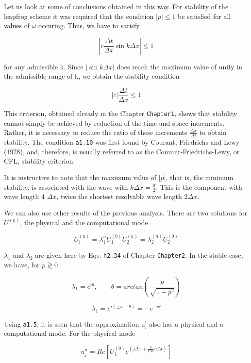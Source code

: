 Let us look at some of conclusions obtained in this way. For stability
of the leapfrog scheme it was required that the condition
\( \left| p \right| \leq 1 \) be satisfied for all values of \(\omega\)
occuring. Thus, we have to satisfy

\[\left| c\frac{\Delta t}{\Delta x}\sin{k\Delta x } \right| \leq 1\]

for any admissible k. Since \(\left| \sin{k\Delta x} \right|\) does
reach the maximum value of unity in the admissible range of k, we obtain
the stability condition

 \[\left| c \right|\frac{\Delta t}{\Delta x} \leq 1\]

This criterion, obtained already in the Chapter \texttt{Chapter1}, shows
that stability cannot simply be achieved by reduction of the time and
space increments. Rather, it is necessary to reduce the ratio of these
increments \(\frac{\Delta x}{\Delta t }\) to obtain stability. The
condition \texttt{a1.10} was first found by Courant, Friedrichs and Lewy
(1928), and, therefore, is usually referred to as the
Courant-Friedrichs-Lewy, or CFL, stability criterion.

It is instructive to note that the maximum value of
\(\left| p \right|\), that is, the minimum stability, is associated with
the wave with \(k\Delta x = \frac{\pi}{2}\). This is the component with
wave length 4 \(\Delta x\), twice the shortest resolvable wave length
\(2\Delta x\).

We can also use other results of the previous analysis. There are two
solutions for \(U^{\left( n \right)}\), the physical and the
computational mode

 \[U_{1}^{\left( n \right)} = \lambda_{1}^{n}U_{1}^{\left( 0 \right)}U_{2}^{\left( n \right)}
= \lambda_{2}^{\left( n \right)}U_{2}^{\left( 0 \right)}\]

\(\lambda_{1}\) and \(\lambda_{2 }\) are given here by Eqs.
\texttt{h2.34} of Chapter \texttt{Chapter2}. In the stable case, we
have, for \(p \gtrless 0\)

 \[\lambda_{1} = c^{i\theta}, \qquad \theta = arctan\left( \frac{p}{\sqrt{1 - p^{2}}} \right)\]

\[\lambda_{1} = e^{i\left( \pm\pi-\theta\right)} = - e^{- i\theta}\]

Using \texttt{a1.5}, it is seen that the approximation u{]} also has a
physical and a computational mode. For the physical mode

 \[u_{j}^{n} = Re\left\lbrack U_{1}^{\left( 0 \right)}e^{\left( j\Delta x
+ \frac{\theta}{k\Delta t}n\Delta t \right)} \right\rbrack\]

